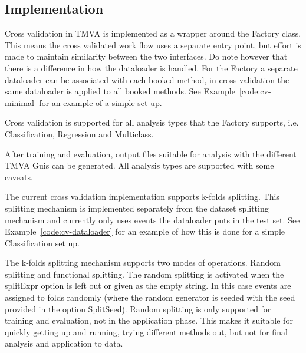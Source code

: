 \subsection{Implementation}



Cross validation in TMVA is implemented as a wrapper around the Factory class. This means the cross validated work flow uses a separate entry point, but effort is made to maintain similarity between the two interfaces. Do note however that there is a difference in how the dataloader is handled. For the Factory a separate dataloader can be associated with each booked method, in cross validation the same dataloader is applied to all booked methods. See Example~\ref{code:cv-minimal} for an example of a simple set up.

Cross validation is supported for all analysis types that the Factory supports, i.e. Classification, Regression and Multiclass.

After training and evaluation, output files suitable for analysis with the different TMVA Guis can be generated. All analysis types are supported with some caveats.

The current cross validation implementation supports k-folds splitting. This splitting mechanism is implemented separately from the dataset splitting mechanism and currently only uses events the dataloader puts in the test set. See Example~\ref{code:cv-dataloader} for an example of how this is done for a simple Classification set up.

The k-folds splitting mechanism supports two modes of operations. Random splitting and functional splitting. The random splitting is activated when the splitExpr option is left out or given as the empty string. In this case events are assigned to folds randomly (where the random generator is seeded with the seed provided in the option SplitSeed). Random splitting is only supported for training and evaluation, not in the application phase. This makes it suitable for quickly getting up and running, trying different methods out, but not for final analysis and application to data.

